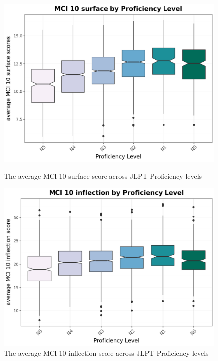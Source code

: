 \begin{figure}[htbp]
    \centering
    \begin{minipage}{.48\textwidth}
        \centering
    \includegraphics[scale=.4]{img/MCI10surface}
    \caption[Average MCI 10 surface scores across Proficiency levels]{The average MCI 10 surface score across JLPT Proficiency levels}
        \label{fig:MCI10surface}
    \end{minipage}
    \hfill
\begin{minipage}{.48\textwidth}
        \centering
        \includegraphics[scale=.4]{img/MCI10inflection}
        \caption[Average MCI 10 inflection scores across Proficiency levels]{The average MCI 10 inflection score across JLPT Proficiency levels}
\label{fig:MCI10inflection}
\end{minipage}
    \end{figure}

